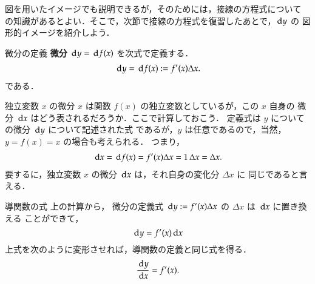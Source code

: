             図を用いたイメージでも説明できるが，そのためには，接線の方程式について
            の知識があるとよい．そこで，次節で接線の方程式を復習したあとで，$\,\mathrm{d} y$ の
            図形的イメージを紹介しよう．\\

            \begin{itembox}[l]{微分の定義}
            \textbf{微分}  $\,\mathrm{d} y= \,\mathrm{d} f(x)$ を次式で定義する．
                    \begin{align}
                        \,\mathrm{d} y = \,\mathrm{d} f(x) := f'(x)\Delta x.
                    \end{align}
            である．
            \end{itembox}

            \begin{memo}{独立変数 $x$ の微分}
                $x$ は関数 $f(x)$ の独立変数としているが，この $x$ 自身の
                微分 $\,\mathrm{d} x$ はどう表されるだろうか．ここで計算しておこう．
                定義式は $y$ についての微分 $\,\mathrm{d} y$ について記述された式
                であるが，$y$ は任意であるので，当然，$y=f(x)=x$ の場合も考えられる．
                つまり，
                    \begin{align}
                        \,\mathrm{d} x = \,\mathrm{d} f(x) = f'(x)\Delta x = 1\,\Delta x = \Delta x.
                    \end{align}
                要するに，独立変数 $x$ の微分 $\,\mathrm{d} x$ は，それ自身の変化分 $\Delta x$ に
                同じであると言える．
            \end{memo}

            \begin{memo}{導関数の式}
                上の計算から，
                微分の定義式 $\,\mathrm{d} y:=f'(x)\Delta x$ の $\Delta x$ は $\,\mathrm{d} x$ に置き換える
                ことができて，
                    \begin{equation*}
                        \,\mathrm{d} y=f'(x)\,\mathrm{d} x
                    \end{equation*}
                上式を次のように変形させれば，導関数の定義と同じ式を得る．
                    \begin{align}
                        \frac{\,\mathrm{d} y}{\,\mathrm{d} x}=f'(x).
                    \end{align}
            \end{memo}

